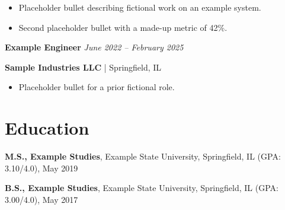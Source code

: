 \begin{itemize}
\item Placeholder bullet describing fictional work on an example system.
\item Second placeholder bullet with a made-up metric of 42\%.
\end{itemize}

\textbf{Example Engineer} \hfill \textit{June 2022 -- February 2025}

\textbf{Sample Industries LLC} | Springfield, IL

\begin{itemize}
\item Placeholder bullet for a prior fictional role.
\end{itemize}

\section*{Education}

\textbf{M.S., Example Studies}, Example State University, Springfield, IL (GPA: 3.10/4.0), May 2019

\textbf{B.S., Example Studies}, Example State University, Springfield, IL (GPA: 3.00/4.0), May 2017


